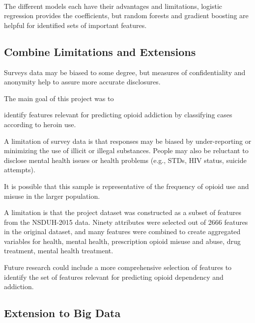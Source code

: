 \\\documentclass[sigconf]{acmart}
\begin{document}
The different models each have their advantages and limitations, logistic regression provides the coefficients, but random forests and gradient boosting are helpful for 
identified sets of important features.

\subsection{Combine Limitations and Extensions}

Surveys data may be biased to some degree, but measures of confidentiality and 
anonymity help to assure more accurate disclosures. 

The main goal of this project was to 


identify features relevant for predicting 
opioid addiction by classifying cases according to heroin use. 

A limitation of survey data is that responses may be biased by under-reporting or minimizing the use of illicit or illegal substances. People may also be reluctant to disclose mental health issues or health problems (e.g., STDs, HIV status, suicide attempts). 

It is possible that this sample is representative of the frequency of opioid use 
and misuse in the larger population.


A limitation is that the project dataset was constructed as a subset of 
features from the NSDUH-2015 data. 
Ninety attributes were selected out of 2666 features in the original dataset, 
and many features were combined to create aggregated variables for health, 
mental health, prescription opioid misuse and abuse, drug treatment, mental health
treatment. 

Future research could include a more comprehensive selection of
features to identify the set of features relevant for predicting opioid
dependency and addiction. 


\subsection{Extension to Big Data}
\end{document}
